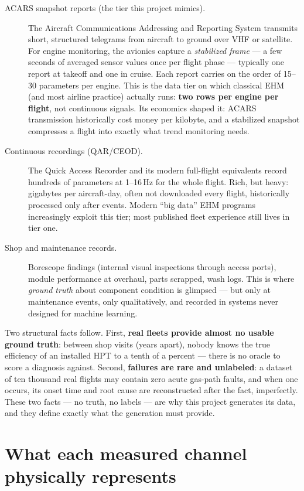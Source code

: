 \begin{description}
  \item[ACARS snapshot reports (the tier this project mimics).] The Aircraft
    Communications Addressing and Reporting System transmits short, structured telegrams
    from aircraft to ground over VHF or satellite. For engine monitoring, the avionics
    capture a \emph{stabilized frame} --- a few seconds of averaged sensor values once
    per flight phase --- typically one report at takeoff and one in cruise. Each report
    carries on the order of 15--30 parameters per engine. This is the data tier on which
    classical EHM (and most airline practice) actually runs: \textbf{two rows per engine
    per flight}, not continuous signals. Its economics shaped it: ACARS transmission
    historically cost money per kilobyte, and a stabilized snapshot compresses a flight
    into exactly what trend monitoring needs.
  \item[Continuous recordings (QAR/CEOD).] The Quick Access Recorder and its modern
    full-flight equivalents record hundreds of parameters at 1--16\,Hz for the whole
    flight. Rich, but heavy: gigabytes per aircraft-day, often not downloaded every
    flight, historically processed only after events. Modern ``big data'' EHM programs
    increasingly exploit this tier; most published fleet experience still lives in tier
    one.
  \item[Shop and maintenance records.] Borescope findings (internal visual inspections
    through access ports), module performance at overhaul,
    parts scrapped, wash logs. This is where \emph{ground truth} about component condition
    is glimpsed --- but only at maintenance events, only qualitatively, and recorded in
    systems never designed for machine learning.
\end{description}

Two structural facts follow. First, \textbf{real fleets provide almost no usable ground
truth}: between shop visits (years apart), nobody knows the true efficiency of an
installed HPT to a tenth of a percent --- there is no oracle to score a diagnosis
against. Second, \textbf{failures are rare and unlabeled}: a dataset of ten thousand
real flights may contain zero acute gas-path faults, and when one occurs, its onset time
and root cause are reconstructed after the fact, imperfectly. These two facts --- no
truth, no labels --- are why this project generates its data, and they define exactly
what the generation must provide.

\section{What each measured channel physically represents}
\label{sec:channel-meaning}

